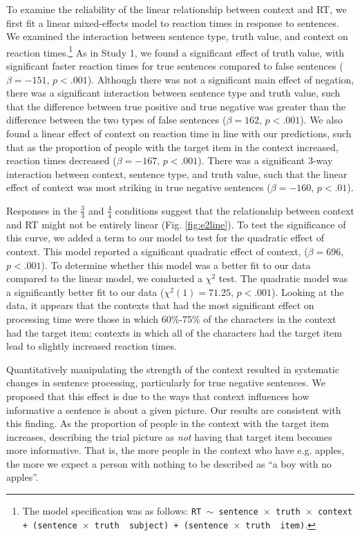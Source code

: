 \documentclass[10pt,letterpaper]{article}
\begin{document}
To examine the reliability of the linear relationship between context and RT, we first fit a linear mixed-effects model to reaction times in response to sentences.  We examined the interaction between sentence type, truth value, and context on reaction times.\footnote{The model specification was as follows: \texttt{RT $\sim$ sentence~$\times$~truth~$\times$~context + (sentence~$\times$~truth~\textbar~subject) +  (sentence~$\times$~truth~\textbar~item)}.}  As in Study 1, we found a significant effect of truth value, with significant faster reaction times for true sentences compared to false sentences ($\beta= -151$, $p< .001$).  Although there was not a significant main effect of negation, there was a significant interaction between sentence type and truth value, such that the difference between true positive and true negative was greater than the difference between the two types of false sentences ($\beta= 162$, $p< .001$).  We also found a linear effect of context on reaction time in line with our predictions, such that as the proportion of people with the target item in the context increased, reaction times decreased ($\beta= -167$, $p< .001$).   There was a significant 3-way interaction between context, sentence type, and truth value, such that the linear effect of context was most striking in true negative sentences ($\beta= -160$, $p< .01$).

Responses in the $\frac{3}{3}$ and $\frac{4}{4}$ conditions suggest that the relationship between context and RT might not be entirely linear (Fig. \ref{fig:e2line}).  To test the significance of this curve, we added a term to our model to test for the quadratic effect of context.  This model reported a significant quadratic effect of context,  ($\beta= 696 $, $p< .001$).  To determine whether this model was a better fit to our data compared to the linear model, we conducted a $\chi^2$ test.  The quadratic model was a significantly better fit to our data ($\chi^{2}(1) = 71.25$, $p<.001$).  Looking at the data, it appears that the contexts that had the most significant effect on processing time were those in which 60\%-75\% of the characters in the context had the target item; contexts in which all of the characters had the target item lead to slightly increased reaction times.    

Quantitatively manipulating the strength of the context resulted in systematic changes in sentence processing, particularly for true negative sentences.  We proposed that this effect is due to the ways that context influences how informative a sentence is about a given picture.  Our results are consistent with this finding.  As the proportion of people in the context with the target item increases, describing the trial picture as \emph{not} having that target item becomes more informative.  That is, the more people in the context who have e.g. apples, the more we expect a person with nothing to be described as ``a boy with no apples''.  
\end{document}
